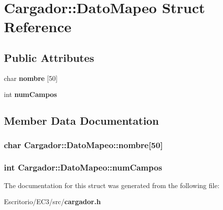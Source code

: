 \section{Cargador::DatoMapeo Struct Reference}
\label{structCargador_1_1DatoMapeo}
\subsection*{Public Attributes}
\begin{CompactItemize}
\item 
char {\bf nombre} [50]
\item 
int {\bf numCampos}
\end{CompactItemize}


\subsection{Member Data Documentation}
\subsubsection{\setlength{\rightskip}{0pt plus 5cm}char {\bf Cargador::DatoMapeo::nombre}[50]}\label{structCargador_1_1DatoMapeo_400b231badf94d9134dc903fd49a09b7}


\subsubsection{\setlength{\rightskip}{0pt plus 5cm}int {\bf Cargador::DatoMapeo::numCampos}}\label{structCargador_1_1DatoMapeo_37a683902992a4f7c6dd2be1e8ad28e3}




The documentation for this struct was generated from the following file:\begin{CompactItemize}
\item 
Escritorio/EC3/src/{\bf cargador.h}\end{CompactItemize}
